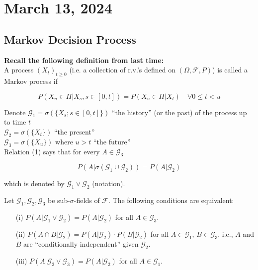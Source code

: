 \newpage
\section{March 13, 2024}
\subsection{Markov Decision Process}
\textbf{Recall the following definition from last time:} \\
A process $(X_t)_{t\geq0}$ (i.e. a collection of r.v.'s defined on $(\Omega, \mathcal{F}, P)$) is called a Markov process if 

\begin{equation}
    P(X_u \in H | X_s, s \in [0,t]) = P(X_u \in H | X_t) \quad \forall 0 \leq t < u
\end{equation}

Denote $\mathcal{G}_1 = \sigma(\{X_s ; s \in [0,t]\})$ ``the history'' (or the past) of the process up to time $t$ \\
$\mathcal{G}_2 = \sigma(\{X_t\})$ ``the present'' \\
$\mathcal{G}_3 = \sigma(\{X_u\})$ where $u>t$ ``the future'' \\
Relation (1) says that for every $A \in \mathcal{G}_3$

\begin{equation}
    P(A | \sigma(\mathcal{G}_1 \cup \mathcal{G}_2)) = P(A | \mathcal{G}_2)
\end{equation}

which is denoted by $\mathcal{G}_1 \lor \mathcal{G}_2$ (notation).


\begin{lemma}[Problem 3.11]
Let $\mathcal{G}_1, \mathcal{G}_2, \mathcal{G}_3$ be sub-$\sigma$-fields of $\mathcal{F}$. The following conditions are equivalent:

\begin{itemize}
    \item[(i)] $P(A | \mathcal{G}_1 \vee \mathcal{G}_2) = P(A | \mathcal{G}_2)$ for all $A \in \mathcal{G}_3$.
    \item[(ii)] $P(A \cap B | \mathcal{G}_2) = P(A | \mathcal{G}_2) \cdot P(B | \mathcal{G}_2)$ for all $A \in \mathcal{G}_1$, $B \in \mathcal{G}_3$, i.e., $A$ and $B$ are ``conditionally independent'' given $\mathcal{G}_2$.
    \item[(iii)] $P(A | \mathcal{G}_2 \vee \mathcal{G}_3) = P(A | \mathcal{G}_2)$ for all $A \in \mathcal{G}_1$.
\end{itemize}
\end{lemma}



